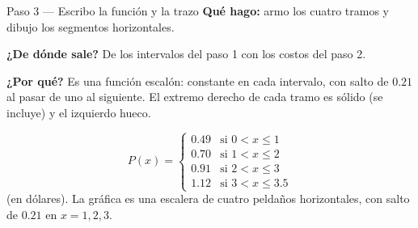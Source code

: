 \documentclass[11pt]{article}
\begin{document}
\begin{paso}{Paso 3 --- Escribo la función y la trazo}
\textbf{Qué hago:} armo los cuatro tramos y dibujo los segmentos horizontales.

\textbf{¿De dónde sale?} De los intervalos del paso 1 con los costos del paso 2.

\textbf{¿Por qué?} Es una función escalón: constante en cada intervalo, con salto de $0.21$ al pasar de uno al siguiente. El extremo derecho de cada tramo es sólido (se incluye) y el izquierdo hueco.

\begin{center}
\end{center}
\end{paso}

\begin{resp}
\[
P(x)=\begin{cases}
0.49 & \text{si } 0<x\le 1\\
0.70 & \text{si } 1<x\le 2\\
0.91 & \text{si } 2<x\le 3\\
1.12 & \text{si } 3<x\le 3.5
\end{cases}
\]
(en dólares). La gráfica es una escalera de cuatro peldaños horizontales, con salto de $0.21$ en $x=1,2,3$.
\end{resp}
\end{document}
